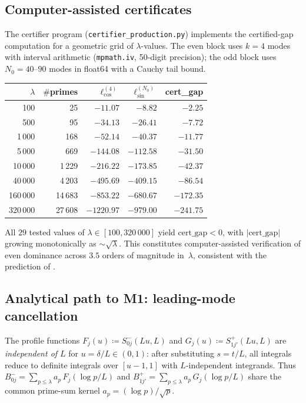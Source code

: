 \documentclass[12pt,a4paper]{article}
\theoremstyle{definition}
\theoremstyle{remark}
\begin{document}
\subsection{Computer-assisted certificates}
\label{sec:certificates}

The certifier program (\texttt{certifier\_production.py}) implements the certified-gap computation for a geometric grid of $\lambda$-values. The even block uses $k = 4$ modes with interval arithmetic (\texttt{mpmath.iv}, 50-digit precision); the odd block uses $N_0 = 40$--$90$ modes in float64 with a Cauchy tail bound.

\begin{center}
\renewcommand{\arraystretch}{1.15}
\begin{tabular}{r|r|r|r|r}
$\lambda$ & $\#$primes & $\ell_{\cos}^{(4)}$ & $\ell_{\sin}^{(N_0)}$ & cert\_gap \\\hline
100   & 25     & $-11.07$ & $-8.82$   & $-2.25$ \\
500   & 95     & $-34.13$ & $-26.41$  & $-7.72$ \\
1\,000 & 168   & $-52.14$ & $-40.37$  & $-11.77$ \\
5\,000 & 669   & $-144.08$ & $-112.58$ & $-31.50$ \\
10\,000 & 1\,229 & $-216.22$ & $-173.85$ & $-42.37$ \\
40\,000 & 4\,203 & $-495.69$ & $-409.15$ & $-86.54$ \\
160\,000 & 14\,683 & $-853.22$ & $-680.67$ & $-172.35$ \\
320\,000 & 27\,608 & $-1220.97$ & $-979.00$ & $-241.75$
\end{tabular}
\end{center}

\noindent All $29$ tested values of $\lambda \in [100, 320\,000]$ yield $\mathrm{cert\_gap} < 0$, with $|\mathrm{cert\_gap}|$ growing monotonically as $\sim\!\sqrt{\lambda}$. This constitutes computer-assisted verification of even dominance across $3.5$ orders of magnitude in~$\lambda$, consistent with the prediction of .

\subsection{Analytical path to M1: leading-mode cancellation}
\label{sec:leading-mode}

The profile functions $F_j(u) \coloneqq S^-_{0j}(Lu, L)$ and $G_j(u) \coloneqq S^+_{1j'}(Lu, L)$ are \emph{independent of $L$} for $u = \delta/L \in (0,1)$: after substituting $s = t/L$, all integrals reduce to definite integrals over $[u-1, 1]$ with $L$-independent integrands. Thus $B_{0j}^- = \sum_{p \leq \lambda} a_p\, F_j(\log p/L)$ and $B_{1j'}^+ = \sum_{p \leq \lambda} a_p\, G_j(\log p/L)$ share the common prime-sum kernel $a_p = (\log p)/\sqrt{p}$.
\end{document}
